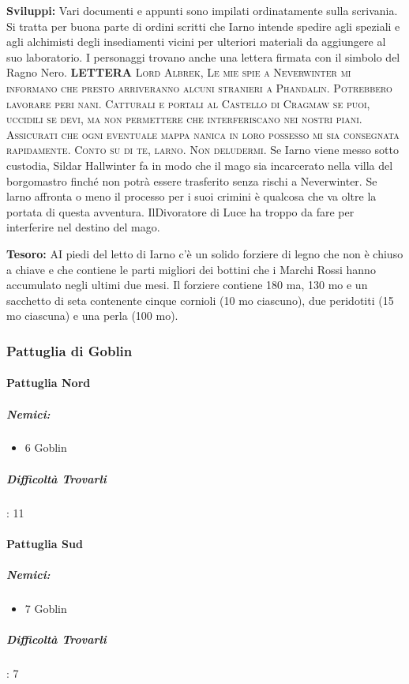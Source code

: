 \documentclass{article}
\begin{document}
\textbf{Sviluppi:}
Vari documenti e appunti sono impilati ordinatamente sulla
scrivania. Si tratta per buona parte di ordini scritti che
Iarno intende spedire agli speziali e agli alchimisti degli
insediamenti vicini per ulteriori materiali da aggiungere
al suo laboratorio. I personaggi trovano anche una lettera
firmata con il simbolo del Ragno Nero. \textbf{LETTERA} \textsc{Lord Albrek,
Le mie spie a Neverwinter mi informano che presto
arriveranno alcuni stranieri a Phandalin. Potrebbero lavorare
peri nani. Catturali e portali al Castello di Cragmaw se puoi, uccidili se devi, ma non
permettere che interferiscano nei nostri piani. Assicurati
che ogni eventuale mappa nanica in loro possesso mi sia
consegnata rapidamente.
Conto su di te, larno. Non deludermi.}
Se Iarno viene messo sotto custodia, Sildar Hallwinter fa in
modo che il mago sia incarcerato nella villa del borgomastro
finché non potrà essere trasferito senza rischi a Neverwinter.
Se larno affronta o meno il processo per i suoi crimini è
qualcosa che va oltre la portata di questa avventura. IlDivoratore di Luce ha troppo da fare per interferire nel destino del mago.

\textbf{Tesoro:}
AI piedi del letto di Iarno c'è un solido forziere di legno che
non è chiuso a chiave e che contiene le parti migliori dei
bottini che i Marchi Rossi hanno accumulato negli ultimi
due mesi. Il forziere contiene 180 ma, 130 mo e un sacchetto
di seta contenente cinque cornioli (10 mo ciascuno), due
peridotiti (15 mo ciascuna) e una perla (100 mo). 

\subsubsection{Pattuglia di Goblin}
            \paragraph{Pattuglia Nord}
                \subparagraph{Nemici:}
                        \begin{itemize}
                            \item 6 Goblin
                        \end{itemize}
                \subparagraph{Difficoltà Trovarli}: 11
            \paragraph{Pattuglia Sud}
                        \subparagraph{Nemici:}
                        \begin{itemize}
                            \item 7 Goblin
                        \end{itemize}
                        \subparagraph{Difficoltà Trovarli}: 7
\end{document}
